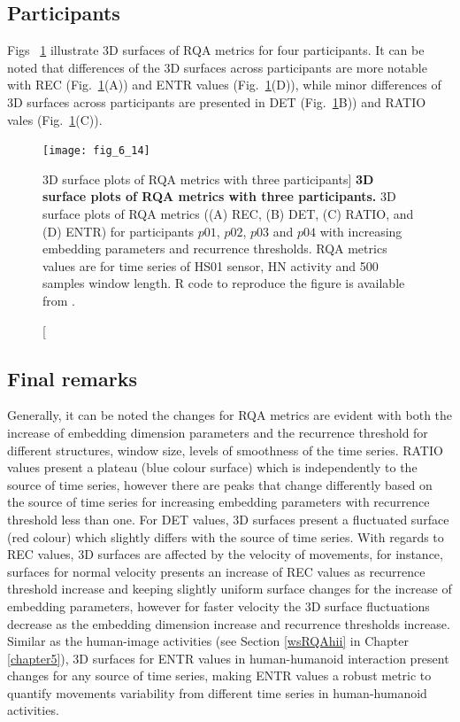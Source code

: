 \subsection{Participants}
Figs ~\ref{fig:topo_participants} illustrate 3D surfaces of RQA metrics for 
four participants.
It can be noted that differences of the 3D surfaces across participants 
are more notable with REC (Fig.~\ref{fig:topo_participants}(A)) and 
ENTR values (Fig.~\ref{fig:topo_participants}(D)),
while minor differences of 3D surfaces across participants are 
presented in
DET (Fig.~\ref{fig:topo_participants}B)) and 
RATIO vales (Fig.~\ref{fig:topo_participants}(C)).
\begin{figure}
\centering
\texttt{[image: fig\_6\_14]}
    \caption
	[3D surface plots of RQA metrics with three participants]{
	{\bf 3D surface plots of RQA metrics with three participants.}
	3D surface plots of RQA metrics ((A) REC, (B) DET, (C) RATIO, and (D) ENTR) 
	for participants $p01$, $p02$, $p03$ and $p04$ with increasing embedding 
	parameters and recurrence thresholds.
	RQA metrics values are for time series of HS01 sensor, 
	HN activity and 500 samples window length.
	R code to reproduce the figure is available from \cite{xochicale2018}.
 }
\label{fig:topo_participants}
\end{figure}

\newpage
\subsection{Final remarks}
Generally, it can be noted the changes for RQA metrics are evident
with both the increase of embedding dimension parameters and the 
recurrence threshold for different structures, window size, 
levels of smoothness of the time series. 
RATIO values present a plateau (blue colour surface) which is independently 
to the source of time series, however there are peaks that change 
differently based on the source of time series for increasing 
embedding parameters  with recurrence threshold less than one.
For DET values, 3D surfaces present a fluctuated surface (red colour)
which slightly differs with the source of time series.
With regards to REC values, 3D surfaces are affected by the velocity
of movements, for instance, surfaces for normal velocity presents 
an increase of REC values as recurrence threshold increase and keeping 
slightly uniform surface changes for the increase of embedding parameters, 
however for faster velocity the 3D surface fluctuations decrease as 
the embedding dimension increase and recurrence thresholds increase.
Similar as the human-image activities  
(see Section \ref{wsRQAhii} in Chapter \ref{chapter5}), 
3D surfaces for ENTR values in human-humanoid interaction  
present changes for any source of time series,
making ENTR values a robust metric to quantify movements variability 
from different time series in human-humanoid activities.

